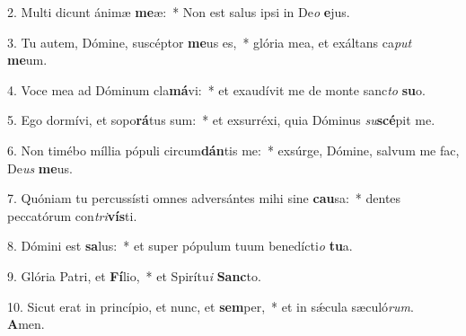 2. Multi dicunt ánimæ \textbf{me}æ:~*  Non est salus ipsi in De\textit{o} \textbf{e}jus.\

3. Tu autem, Dómine, suscéptor \textbf{me}us es,~*  glória mea, et exáltans ca\textit{put} \textbf{me}um.\

4. Voce mea ad Dóminum cla\textbf{má}vi:~*  et exaudívit me de monte sanc\textit{to} \textbf{su}o.\

5. Ego dormívi, et sopo\textbf{rá}tus sum:~*  et exsurréxi, quia Dóminus \textit{su}\textbf{scé}pit me.\

6. Non timébo míllia pópuli circum\textbf{dán}tis me:~*  exsúrge, Dómine, salvum me fac, De\textit{us} \textbf{me}us.\

7. Quóniam tu percussísti omnes adversántes mihi sine \textbf{cau}sa:~*  dentes peccatórum con\textit{tri}\textbf{vís}ti.\

8. Dómini est \textbf{sa}lus:~*  et super pópulum tuum benedícti\textit{o} \textbf{tu}a.\

9. Glória Patri, et \textbf{Fí}lio,~*  et Spirítu\textit{i} \textbf{Sanc}to.\

10. Sicut erat in princípio, et nunc, et \textbf{sem}per,~*  et in sǽcula sæculó\textit{rum}. \textbf{A}men.\


